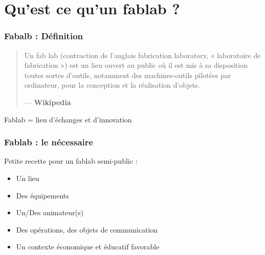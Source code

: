 \documentclass[10pt, compress]{beamer}
\begin{document}
	\section{Qu'est ce qu'un fablab ?}
	\begin{frame}
		\frametitle{Fabalb : Définition}
		\begin{quotation}
			Un fab lab (contraction de l'anglais fabrication laboratory, « laboratoire de fabrication ») est un lieu ouvert au
			public où il est mis à sa disposition toutes sortes d'outils, notamment des machines-outils pilotées par
			ordinateur, pour la conception et la réalisation d'objets.\\
			\begin{flushright}
			--- \textbf{Wikipedia}
			\end{flushright}
		\end{quotation}
		\pause

		\begin{center}
			\large Fablab = \alert{lieu d'échanges et d'innovation}
		\end{center}
	\end{frame}

	\begin{frame}
		\frametitle{Fablab : le nécessaire}

		Petite recette pour un fablab semi-public :

		\pause

		\begin{itemize}[<+->]
			\item Un \alert{lieu}
			\item Des \alert{équipements}
			\item Un/Des animateur(s)
			\item Des opérations, des objets de \alert{communication}
			\item Un \alert{contexte} économique et éducatif \alert{favorable}
		\end{itemize}
	\end{frame}
\end{document}
